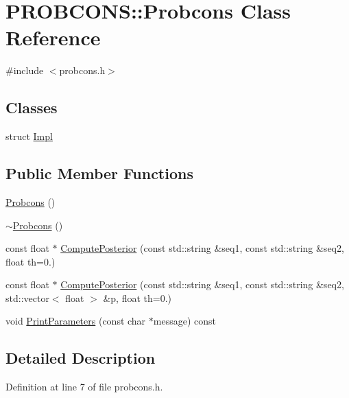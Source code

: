 \hypertarget{class_p_r_o_b_c_o_n_s_1_1_probcons}{\section{P\+R\+O\+B\+C\+O\+N\+S\+:\+:Probcons Class Reference}
\label{class_p_r_o_b_c_o_n_s_1_1_probcons}
}


{\ttfamily \#include $<$probcons.\+h$>$}

\subsection*{Classes}
\begin{DoxyCompactItemize}
\item 
struct \hyperlink{struct_p_r_o_b_c_o_n_s_1_1_probcons_1_1_impl}{Impl}
\end{DoxyCompactItemize}
\subsection*{Public Member Functions}
\begin{DoxyCompactItemize}
\item 
\hyperlink{class_p_r_o_b_c_o_n_s_1_1_probcons_ac223e94077c0abc61442496466c0c3af}{Probcons} ()
\item 
\hyperlink{class_p_r_o_b_c_o_n_s_1_1_probcons_a58de299b78c539f04b54b22bb8e406d3}{$\sim$\+Probcons} ()
\item 
const float $\ast$ \hyperlink{class_p_r_o_b_c_o_n_s_1_1_probcons_a61a2ebb7c173114f63499608e8ccf481}{Compute\+Posterior} (const std\+::string \&seq1, const std\+::string \&seq2, float th=0.)
\item 
const float $\ast$ \hyperlink{class_p_r_o_b_c_o_n_s_1_1_probcons_aec5f17e3df4cbc788e69e85de35e7cb5}{Compute\+Posterior} (const std\+::string \&seq1, const std\+::string \&seq2, std\+::vector$<$ float $>$ \&p, float th=0.)
\item 
void \hyperlink{class_p_r_o_b_c_o_n_s_1_1_probcons_aba4729d2c1968bb7696ee5ead2bf770e}{Print\+Parameters} (const char $\ast$message) const 
\end{DoxyCompactItemize}


\subsection{Detailed Description}


Definition at line 7 of file probcons.\+h.



